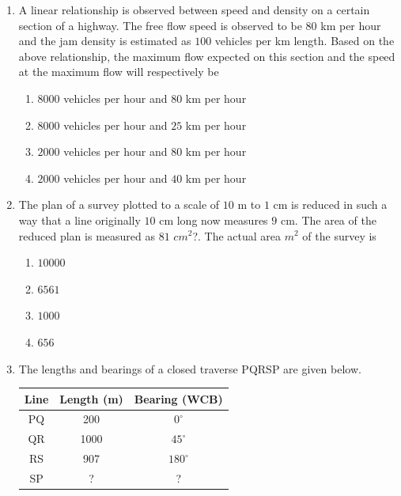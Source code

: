 \documentclass[journal]{IEEEtran}
\begin{document}
\begin{enumerate}
\item A linear relationship is observed between speed and density on a certain section of a highway. The free flow speed is observed to be $80$ km per hour and the jam density is estimated as $100$ vehicles per km length. Based on the above relationship, the maximum flow expected on this section and the speed at the maximum flow will respectively be \textbf{}
\begin{multicols}{2}
\begin{enumerate}
\item $8000$ vehicles per hour and $80$ km per hour
\item $8000$ vehicles per hour and $25$ km per hour
\item $2000$ vehicles per hour and $80$ km per hour
\item $2000$ vehicles per hour and $40$ km per hour
\end{enumerate}  
\end{multicols}

\item The plan of a survey plotted to a scale of $10$ m to $1$ cm is reduced in such a way that a line originally $10$ cm long now measures $9$ cm. The area of the reduced plan is measured as $81$ $cm^{2}$?. The actual area $m^{2}$ of the survey is \textbf{}
\begin{multicols}{2}
\begin{enumerate}
\item $10000$
\item $6561$
\item $1000$
\item $656$ 
\end{enumerate}  
\end{multicols}

\item The lengths and bearings of a closed traverse PQRSP are given below.

\vspace{0.3cm}

\begin{tabular}{|c|c|c|}
\hline
\textbf{Line} & \textbf{Length (m)} & \textbf{Bearing (WCB)} \\
\hline
PQ & 200 & $0^\circ$ \\
QR & 1000 & $45^\circ$ \\
RS & 907 & $180^\circ$ \\
SP & ? & ? \\
\hline
\end{tabular}


\end{enumerate}
\end{document}
